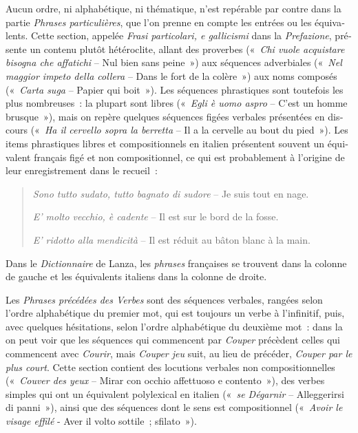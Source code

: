 \documentclass[output=paper,booklanguage=french]{langscibook}
\begin{document}
\begin{otherlanguage}{french}
Aucun ordre, ni alphabétique, ni thématique, n’est repérable par contre dans la partie \emph{Phrases particulières}, que l’on prenne en compte les entrées ou les équivalents. Cette section, appelée \emph{Frasi particolari, e gallicismi} dans la \emph{Prefazione}, présente un contenu plutôt hétéroclite, allant des proverbes («~\emph{Chi vuole acquistare bisogna che affatichi} – Nul bien sans peine~») aux séquences adverbiales («~\emph{Nel maggior impeto della collera} – Dans le fort de la colère~») aux noms composés («~\emph{Carta suga} – Papier qui boit~»). Les séquences phrastiques sont toutefois les plus nombreuses~: la plupart sont libres («~\emph{Egli è uomo aspro} – C’est un homme brusque~»), mais on repère quelques séquences figées verbales présentées en discours («~\emph{Ha il cervello sopra la berretta} – Il a la cervelle au bout du pied~»). Les items phrastiques libres et compositionnels en italien présentent souvent un équivalent français figé et non compositionnel, ce qui est probablement à l’origine de leur enregistrement dans le recueil~: 

\begin{quote}
    \emph{Sono tutto sudato, tutto bagnato di sudore} – Je suis tout en nage.
    
    \emph{E' molto vecchio, è cadente} – Il est sur le bord de la fosse.

    \emph{E’ ridotto alla mendicità} – Il est réduit au bâton blanc à la main.
\end{quote}


Dans le \emph{Dictionnaire} de Lanza, les \emph{phrases} françaises se trouvent dans la colonne de gauche et les équivalents italiens dans la colonne de droite.

Les \emph{Phrases précédées des Verbes} sont des séquences verbales, rangées selon l’ordre alphabétique du premier mot, qui est toujours un verbe à l’infinitif, puis, avec quelques hésitations, selon l’ordre alphabétique du deuxième mot~: dans la  on peut voir que les séquences qui commencent par \emph{Couper} précèdent celles qui commencent avec \emph{Courir}, mais \emph{Couper jeu} suit, au lieu de précéder, \emph{Couper par le plus court}. Cette section contient des locutions verbales non compositionnelles («~\emph{Couver des yeux} – Mirar con occhio affettuoso e contento~»), des verbes simples qui ont un équivalent polylexical en italien («~\emph{se Dégarnir} – Alleggerirsi di panni~»), ainsi que des séquences dont le sens est compositionnel («~\emph{Avoir le visage effilé} - Aver il volto sottile~; sfilato~»).


\end{otherlanguage}
\end{document}
